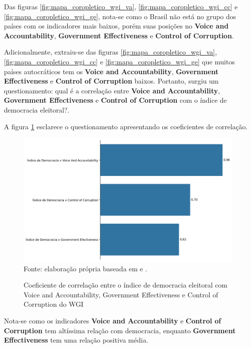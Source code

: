 Das figuras \ref{fig:mapa_coropletico_wgi_va}, \ref{fig:mapa_coropletico_wgi_cc} e \ref{fig:mapa_coropletico_wgi_ge}, nota-se como o Brasil não está no grupo dos países com os indicadores mais baixos, porém suas posições no \textbf{Voice and Accountability}, \textbf{Government Effectiveness} e \textbf{Control of Corruption}.

Adicionalmente, extraiu-se das figuras \ref{fig:mapa_coropletico_wgi_va}, \ref{fig:mapa_coropletico_wgi_cc} e \ref{fig:mapa_coropletico_wgi_ge} que muitos países autocráticos tem os \textbf{Voice and Accountability}, \textbf{Government Effectiveness} e \textbf{Control of Corruption} baixos. Portanto, surgiu um questionamento: qual é a correlação entre \textbf{Voice and Accountability}, \textbf{Government Effectiveness} e \textbf{Control of Corruption} com o índice de democracia eleitoral?. 

A figura \ref{fig:correlacao_indicedemocracia_wgi_ge_cc_va} esclarece o questionamento apresentando os coeficientes de correlação.

\begin{figure}[H]
	\centering
	\caption{Coeficiente de correlação entre o índice de democracia eleitoral com Voice and Accountability, Government Effectiveness e Control of Corruption do WGI}
	\includegraphics[width=1\linewidth]{figuras/correlacao_indicedemocracia_wgi_ge_cc_va}
	\label{fig:correlacao_indicedemocracia_wgi_ge_cc_va}
	\footnotesize{Fonte: elaboração própria baseada em \cite{wgi_dados} e \cite{electoral-democracy-index}.}
\end{figure} 

Nota-se como os indicadores \textbf{Voice and Accountability} e \textbf{Control of Corruption} tem altíssima relação com democracia, enquanto \textbf{Government Effectiveness} tem uma relação positiva média.

